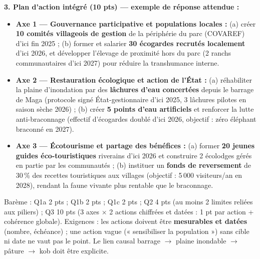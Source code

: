 \documentclass[11pt]{article}
\begin{document}
\begin{corrige}
\textbf{3. Plan d'action intégré (10 pts) — exemple de réponse attendue :}
\begin{itemize}
\item \textbf{Axe 1 — Gouvernance participative et populations locales :} (a) créer \textbf{10 comités villageois de gestion} de la périphérie du parc (COVAREF) d'ici fin 2025 ; (b) former et salarier \textbf{30 écogardes recrutés localement} d'ici 2026, et développer l'élevage de proximité hors du parc (2 ranchs communautaires d'ici 2027) pour réduire la transhumance interne.
\item \textbf{Axe 2 — Restauration écologique et action de l'État :} (a) réhabiliter la plaine d'inondation par des \textbf{lâchures d'eau concertées} depuis le barrage de Maga (protocole signé État-gestionnaire d'ici 2025, 3 lâchures pilotes en saison sèche 2026) ; (b) créer \textbf{5 points d'eau artificiels} et renforcer la lutte anti-braconnage (effectif d'écogardes doublé d'ici 2026, objectif : zéro éléphant braconné en 2027).
\item \textbf{Axe 3 — Écotourisme et partage des bénéfices :} (a) former \textbf{20 jeunes guides éco-touristiques} riverains d'ici 2026 et construire 2 écolodges gérés en partie par les communautés ; (b) instituer un \textbf{fonds de reversement} de 30\,\% des recettes touristiques aux villages (objectif : 5\,000 visiteurs/an en 2028), rendant la faune vivante plus rentable que le braconnage.
\end{itemize}
\end{corrige}

\begin{attention}
Barème : Q1a 2 pts ; Q1b 2 pts ; Q1c 2 pts ; Q2 4 pts (au moins 2 limites reliées aux piliers) ; Q3 10 pts (3 axes $\times$ 2 actions chiffrées et datées : 1 pt par action + cohérence globale). Exigences : les actions doivent être \textbf{mesurables et datées} (nombre, échéance) ; une action vague (« sensibiliser la population ») sans cible ni date ne vaut pas le point. Le lien causal barrage $\to$ plaine inondable $\to$ pâture $\to$ kob doit être explicite.
\end{attention}
\end{document}
